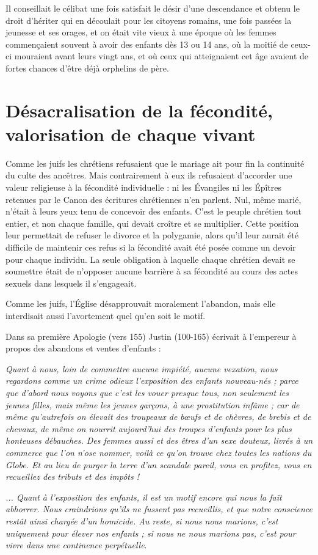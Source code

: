  Il conseillait le célibat une fois satisfait le désir d'une descendance et obtenu le droit d'hériter qui en découlait pour les citoyens romains, une fois passées la jeunesse et ses orages, et on était vite vieux à une époque où les femmes commençaient souvent à avoir des enfants dès 13 ou 14 ans, où la moitié de ceux-ci mouraient avant leurs vingt ans, et où ceux qui atteignaient cet âge avaient de fortes chances d'être déjà orphelins de père. 


\section{Désacralisation de la fécondité, valorisation de chaque vivant}

 Comme les juifs les chrétiens refusaient que le mariage ait pour fin la continuité du culte des ancêtres. Mais contrairement à eux ils refusaient d'accorder une valeur religieuse à la fécondité individuelle : ni les Évangiles ni les Épîtres retenues par le Canon des écritures chrétiennes n'en parlent. Nul, même marié, n'était à leurs yeux tenu de concevoir des enfants. C'est le peuple chrétien tout entier, et non chaque famille, qui devait croître et se multiplier. Cette position leur permettait de refuser le divorce et la polygamie, alors qu'il leur aurait été difficile de maintenir ces refus si la fécondité avait été posée comme un devoir pour chaque individu. La seule obligation à laquelle chaque chrétien devait se soumettre était de n'opposer aucune barrière à sa fécondité au cours des actes sexuels dans lesquels il s'engageait. 

 Comme les juifs, l'Église désapprouvait moralement l'abandon, mais elle interdisait aussi l'avortement quel qu'en soit le motif. 

 Dans sa première Apologie (vers 155) Justin (100-165) écrivait à l'empereur à propos des abandons et ventes d'enfants :

\begin{displayquote}
\emph{Quant à nous, loin de commettre aucune impiété, aucune vexation, nous regardons comme un crime odieux l'exposition des enfants nouveau-nés ; parce que d'abord nous voyons que c'est les vouer presque tous, non seulement les jeunes filles, mais même les jeunes garçons, à une prostitution infâme ; car de même qu'autrefois on élevait des troupeaux de bœufs et de chèvres, de brebis et de chevaux, de même on nourrit aujourd'hui des troupes d'enfants pour les plus honteuses débauches. Des femmes aussi et des êtres d'un sexe douteux, livrés à un commerce que l'on n'ose nommer, voilà ce qu'on trouve chez toutes les nations du Globe. Et au lieu de purger la terre d'un scandale pareil, vous en profitez, vous en recueillez des tributs et des impôts !}

 \emph{... Quant à l'exposition des enfants, il est un motif encore qui nous la fait abhorrer. Nous craindrions qu'ils ne fussent pas recueillis, et que notre conscience restât ainsi chargée d'un homicide. Au reste, si nous nous marions, c'est uniquement pour élever nos enfants ; si nous ne nous marions pas, c'est pour vivre dans une continence perpétuelle}.
\end{displayquote}

